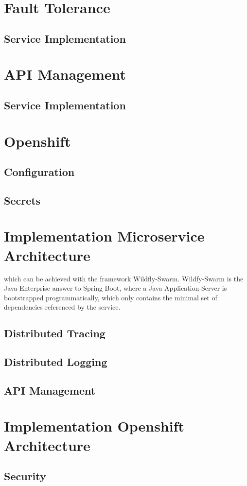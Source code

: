 \section{Fault Tolerance}
\label{sec:esbi-fault}

\subsection{Service Implementation}
\label{sec:esbi-fault-service}

\section{API Management}
\label{sec:esbi-api}

\subsection{Service Implementation}
\label{sec:esbi-api-service}

\section{Openshift}
\label{sec:esbi-openshift}

\subsection{Configuration}
\label{sec:esbi-openshift-config}

\subsection{Secrets}
\label{sec:esbi-openshift-secrets}

\section{Implementation Microservice Architecture}
\label{sec:esbi-impl-services}
 which can be achieved with the framework Wildfly-Swarm. Wildfy-Swarm is the Java Enterprise answer to Spring Boot, where a Java Application Server is bootstrapped programmatically, which only contains the minimal set of dependencies referenced by the service. 

\subsection{Distributed Tracing}
\label{sec:esbi-impl-tracing}

\subsection{Distributed Logging}
\label{sec:esbi-impl-logging}

\subsection{API Management}
\label{sec:esboc-impl-api}

\section{Implementation Openshift Architecture}
\label{sec:esbi-impl-oc}

\subsection{Security}
\label{sec:esboc-impl-security}
